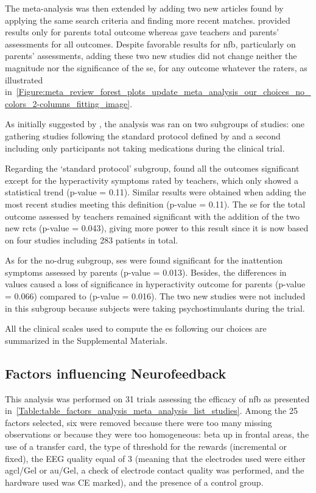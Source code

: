The meta-analysis was then extended by adding two new articles \citep{Strehl2017, Baumeister2016} found 
by applying the same search criteria and finding more recent matches. \citet{Baumeister2016} provided results 
only for parents total outcome whereas \citet{Strehl2017} gave teachers and parents' assessments for all outcomes. 
Despite favorable results for \gls{nfb}, particularly on parents' assessments, adding these two new studies did not 
change neither the magnitude nor the significance of the \gls{se}, for any outcome whatever the raters,
as illustrated in~\cref{Figure:meta_review_forest_plots_update_meta_analysis_our_choices_no_colors_2-columns_fitting_image}. 
 
As initially suggested by \citeauthor{Cortese2016}, the analysis was ran on two subgroups of studies: one gathering 
studies following the standard protocol defined by \citet{Arns2014} and a second including only participants not taking medications 
during the clinical trial. 

Regarding the `standard protocol' subgroup, \citet{Cortese2016} found all the outcomes significant except for the 
hyperactivity symptoms rated by teachers, which only showed a statistical trend (p-value = 0.11). Similar results 
were obtained when adding the most recent studies meeting this definition \citep{Strehl2017} (p-value = 0.11). 
The \gls{se} for the total outcome assessed by teachers remained significant with the addition of the two new
\glspl{rct} (p-value = 0.043), giving more power to this result since it is now based on four studies including 283
patients in total.

As for the no-drug subgroup, \glspl{se} were found significant for the inattention symptoms assessed by parents (p-value = 0.013). 
Besides, the differences in \citet{Arnold2014} values caused a loss of significance in hyperactivity outcome for parents 
(p-value = 0.066) compared to \citet{Cortese2016} (p-value = 0.016). The two new studies were not included in this 
subgroup because subjects were taking psychostimulants during the trial.

All the clinical scales used to compute the \gls{es} following our choices are summarized in the Supplemental Materials.

\subsection{Factors influencing Neurofeedback}

This analysis was performed on 31 trials assessing the efficacy of \gls{nfb} as presented 
in~\cref{Table:table_factors_analysis_meta_analysis_list_studies}. Among the 25 factors selected, six were 
removed because there were too many missing observations or because they were too homogeneous: beta up in frontal areas, 
the use of a transfer card, the type of threshold for the rewards (incremental or fixed), the EEG quality equal of 3
(meaning that the electrodes used were either \gls{agcl}/Gel or \gls{au}/Gel, a check of electrode contact quality was
performed, and the hardware used was CE marked), and the presence of a control group. 

